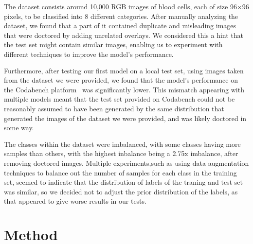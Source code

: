 \documentclass[11pt]{article}
\begin{document}
\begin{multicols}{2}

      The dataset consists around 10,000 RGB images of blood cells, each
      of size 96\(\times\)96 pixels, to be classified into 8 different
      categories. After manually analyzing the dataset, we found that
      a part of it contained duplicate and misleading images that were doctored
      by adding unrelated overlays. We considered this a hint that the test set
      might contain similar images, enabling us to experiment with different
      techniques to improve the model's performance.

      Furthermore, after testing our first model on a local test set, using images
      taken from the dataset we were provided, we found that the model's 
      performance on the Codabench platform~\cite{codabench} was significantly lower. This mismatch
      appearing with multiple models meant that the test set provided on Codabench
      could not be reasonably assumed to have been generated by the same distribution
      that generated the images of the dataset we were provided, and was likely
      doctored in some way.

      The classes within the dataset were imbalanced, with some classes having
      more samples than others, with the highest inbalance being a 2.75x imbalance,
      after removing doctored images. Multiple experiments,such as using data 
      augmentation techniques to balance out the number of samples for each class 
      in the training set, seemed to indicate that the distribution of labels of 
      the traning and test set was similar, so we decided not to adjust the prior 
      distribution of the labels, as that appeared to give worse results in our tests.

      \section{Method}


\end{multicols}
\end{document}
